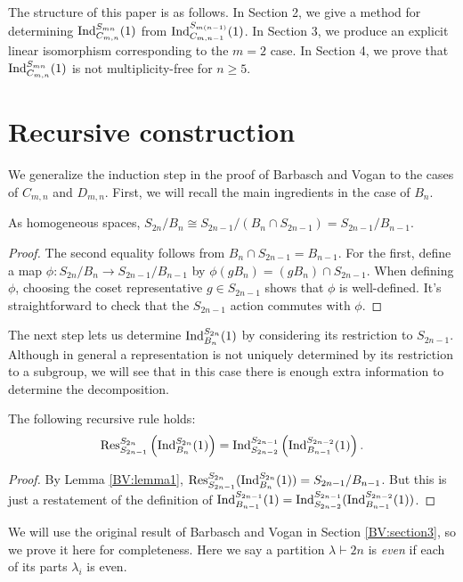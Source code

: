 The structure of this paper is as follows. In Section 2, we give a method for determining $\textup{Ind}_{C_{m,n}}^{S_{mn}}(1)$ from $\textup{Ind}_{C_{m,n-1}}^{S_{m(n-1)}}(1)$. In Section 3, we produce an explicit linear isomorphism corresponding to the $m=2$ case.
In Section 4, we prove that $\textup{Ind}_{C_{m,n}}^{S_{mn}}(1)$ is not multiplicity-free for $n \ge 5$.

\section{Recursive construction}
We generalize the induction step in the proof of Barbasch and Vogan to the cases of $C_{m,n}$ and $D_{m,n}$.
First, we will recall the main ingredients in the case of $B_n$.

\begin{lemma}\label{BV:lemma1}
As homogeneous spaces, 
$S_{2n}/B_n \cong S_{2n-1}/(B_n \cap S_{2n-1}) = S_{2n-1}/B_{n-1}$.
\end{lemma}
\begin{proof}
The second equality follows from $B_n \cap S_{2n-1} = B_{n-1}$. For the first, define a map $\phi: S_{2n} / B_n \to S_{2n-1}/B_{n-1}$ by $\phi(gB_n) = (gB_n) \cap S_{2n-1}$. When defining $\phi$, choosing the coset representative $g \in S_{2n-1}$ shows that $\phi$ is well-defined. It's straightforward to check that the $S_{2n-1}$ action commutes with $\phi$.
\end{proof}

The next step lets us determine $\textup{Ind}_{B_n}^{S_{2n}}(1)$ by considering its restriction to $S_{2n-1}$. Although in general a representation is not uniquely determined by its restriction to a subgroup, we will see that in this case there is enough extra information to determine the decomposition.

\begin{lemma}\label{BV:lemma2}
The following recursive rule holds:
$$\textup{Res}_{S_{2n-1}}^{S_{2n}}\left(\textup{Ind}_{B_n}^{S_{2n}}(1)\right) = \textup{Ind}_{S_{2n-2}}^{S_{2n-1}}\left(\textup{Ind}_{B_{n-1}}^{S_{2n-2}}(1)\right).$$
\end{lemma}
\begin{proof}
By Lemma \ref{BV:lemma1}, $\textup{Res}_{S_{2n-1}}^{S_{2n}}(\textup{Ind}_{B_n}^{S_{2n}}(1)) = S_{2n-1}/B_{n-1}$. But this is just a restatement
of the definition of $ \textup{Ind}_{B_{n-1}}^{S_{2n-1}} (1) = \textup{Ind}_{S_{2n-2}}^{S_{2n-1}}(\textup{Ind}_{B_{n-1}}^{S_{2n-2}}(1))$.
\end{proof}

We will use the original result of Barbasch and Vogan in Section \ref{BV:section3}, so we prove it here for completeness. Here we say a partition $\lambda \vdash 2n$ is {\em even} if each of its parts $\lambda_i$ is even.

